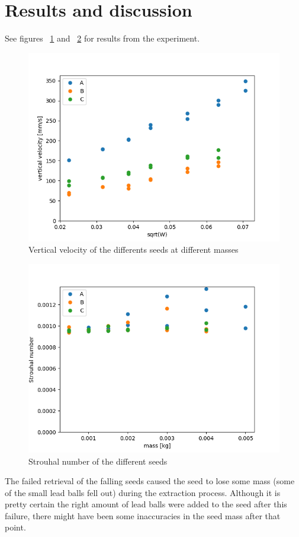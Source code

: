 \documentclass[aps,reprint]{revtex4-1}
\newcommand\blankpage{%
  \null
  \thispagestyle{empty}%
  \addtocounter{page}{-1}%
  \newpage}
\begin{document}
\section{Results and discussion}
See figures ~\ref{fig:oppg1} and ~\ref{fig:oppg2} for results from the
experiment.
\begin{figure}
  \includegraphics[width=0.8\linewidth]{oppg1.png}
  \caption{
    \label{fig:oppg1}
    Vertical velocity of the differents seeds at different masses
  }
\end{figure}
\begin{figure}
  \includegraphics[width=0.8\linewidth]{oppg2.png}
  \caption{
    \label{fig:oppg2}
    Strouhal number of the different seeds
  }
\end{figure}
The failed retrieval of the falling seeds caused the seed to lose some mass
(some of the small lead balls fell out) during the extraction process. Although
it is pretty certain the right amount of lead balls were added to the seed after
this failure, there might have been some inaccuracies in the seed mass after that
point.
\label{sec:results}


\blankpage
\end{document}
